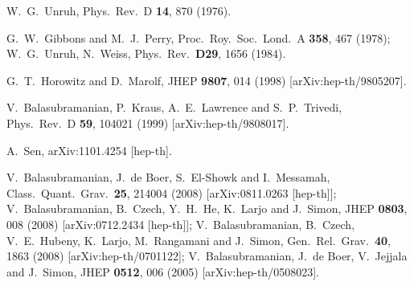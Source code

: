 \documentclass[11pt]{article}
\begin{document}
\begin{thebibliography}{10}
  W.~G.~Unruh,
  Phys.\ Rev.\  D {\bf 14}, 870 (1976).


G.~W.~Gibbons and M.~J.~Perry,
  Proc.\ Roy.\ Soc.\ Lond.\  A {\bf 358}, 467 (1978);
W.~G.~Unruh, N.~Weiss,
  Phys.\ Rev.\  {\bf D29}, 1656 (1984).
  
  G.~T.~Horowitz and D.~Marolf,
  JHEP {\bf 9807}, 014 (1998)
  [arXiv:hep-th/9805207].

  V.~Balasubramanian, P.~Kraus, A.~E.~Lawrence and S.~P.~Trivedi,
  Phys.\ Rev.\  D {\bf 59}, 104021 (1999)
  [arXiv:hep-th/9808017].



  A.~Sen,
  arXiv:1101.4254 [hep-th].




  V.~Balasubramanian, J.~de Boer, S.~El-Showk and I.~Messamah,
  Class.\ Quant.\ Grav.\  {\bf 25}, 214004 (2008)
  [arXiv:0811.0263 [hep-th]];
  V.~Balasubramanian, B.~Czech, Y.~H.~He, K.~Larjo and J.~Simon,
  JHEP {\bf 0803}, 008 (2008)
  [arXiv:0712.2434 [hep-th]];
  V.~Balasubramanian, B.~Czech, V.~E.~Hubeny, K.~Larjo, M.~Rangamani and J.~Simon,
  Gen.\ Rel.\ Grav.\  {\bf 40}, 1863 (2008)
  [arXiv:hep-th/0701122];
  V.~Balasubramanian, J.~de Boer, V.~Jejjala and J.~Simon,
  JHEP {\bf 0512}, 006 (2005)
  [arXiv:hep-th/0508023].
  
  



\end{thebibliography}
\end{document}
